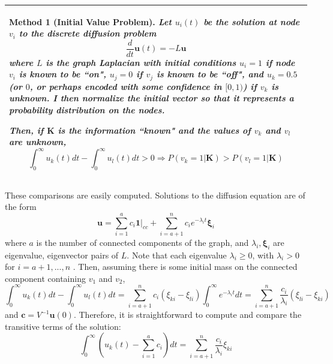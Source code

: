 \documentclass[10pt]{article}
\newtheorem{method}{Method}
\theoremstyle{definition}
\numberwithin{theorem}{section}
\numberwithin{definition}{section}
\numberwithin{lemma}{section}
\numberwithin{corollary}{section}
\numberwithin{clm}{section}
\numberwithin{rmk}{section}
\newenvironment{inbox2}
{\begin{center}
		\begin{tabular}{|p{0.9\textwidth}|}
			\hline \vspace{-0.5 cm}
		}
		{ 
			\\ \hline
		\end{tabular} 
	\end{center}
}
\renewcommand{\b}{\bm}
\begin{document}
\begin{inbox2}
	\begin{method}[Initial Value Problem]\label{initalCond}
		Let $u_i(t)$ be the solution at node $v_i$ to the discrete diffusion problem
		\[
		\frac{d}{dt}\b{u}(t)  = - L\b{u}
		\]
		where $L$ is the  graph Laplacian with initial conditions $u_i = 1$ if node $v_i$ is known to be ``on", $u_j = 0$ if $v_j$ is known to be ``off", and $u_k = 0.5$ (or $0$, or perhaps encoded with some confidence in $[0,1)$) if $v_k$ is unknown. I then normalize the initial vector so that it represents a probability distribution on the nodes.
		
		Then, if $\b{K}$ is the information ``known" and the values of $v_{k}$ and $v_{l}$ are unknown,
		\[
		\int_0^{\infty} u_k(t) dt - \int_0^{\infty} u_l(t) dt >  0 \Rightarrow  P(v_k=  1|\b{K}) > P(v_l = 1|\b{K})
		\]
	\end{method}
\end{inbox2}
These comparisons are easily computed. Solutions to the diffusion equation are of the form
\[
\b{u} = \sum_{i=1}^a c_i \b{1}|_{cc} + \sum_{i=a+1}^n c_i e^{-\lambda_i t} \b{\xi}_i 
\]
where $a$ is the number of connected components of the graph, and $\lambda_i,\b{\xi}_i$ are eigenvalue, eigenvector pairs of $L$. Note that each eigenvalue $\lambda_i \geq 0$, with $\lambda_i>0$ for $i = a+1,...,n$ \cite{vonLuxburg2007}. Then, assuming there is some initial mass on the connected component containing $v_1$ and $v_2$, 
\[
\int_0^{\infty} u_k(t) dt - \int_0^{\infty} u_l(t) dt =   \sum_{i=a+1}^n c_i  (\xi_{ki} - \xi_{li}) \int_0^{\infty} e^{-\lambda_i t} dt = \sum_{i=a+1}^n \frac{c_i}{\lambda_i}  (\xi_{li} - \xi_{ki}) 
\]
and $\b{c} = V^{-1}\b{u}(0)$. Therefore, it is straightforward to compute and compare the transitive terms of the solution:
\[
\int_0^{\infty}\left( u_k(t) - \sum_{i=1}^a c_i \right) dt = \sum_{i=a+1}^n \frac{c_i}{\lambda_i}\xi_{ki}
\]
\end{document}
